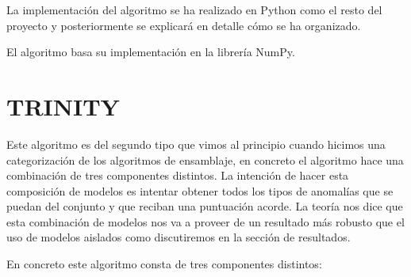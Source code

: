 La implementación del algoritmo se ha realizado en Python como el resto del proyecto y posteriormente se explicará en detalle cómo se ha organizado.

El algoritmo basa su implementación en la librería NumPy.

\section{TRINITY}

Este algoritmo es del segundo tipo que vimos al principio cuando hicimos una categorización de los algoritmos de ensamblaje, en concreto el algoritmo hace una combinación de tres componentes distintos. La intención de hacer esta composición de modelos es intentar obtener todos los tipos de anomalías que se puedan del conjunto y que reciban una puntuación acorde. La teoría nos dice que esta combinación de modelos nos va a proveer de un resultado más robusto que el uso de modelos aislados como discutiremos en la sección de resultados.

En concreto este algoritmo consta de tres componentes distintos:


